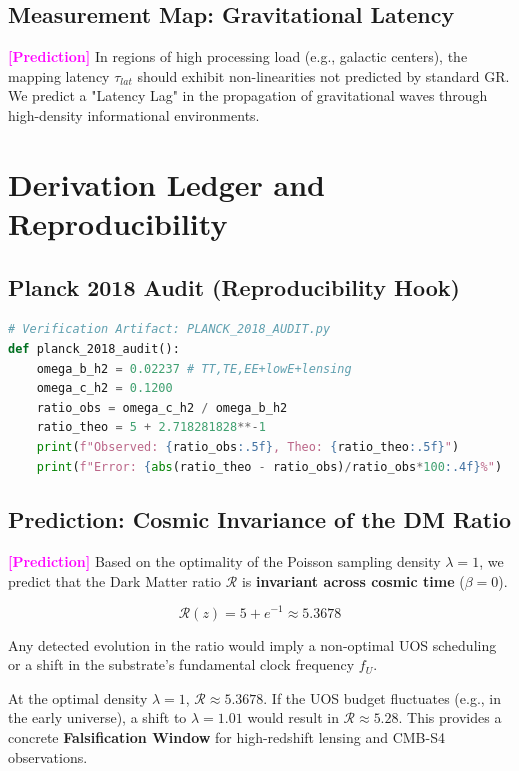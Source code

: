 \documentclass[11pt,titlepage]{article}
\newcommand{\tagpred}{\textcolor{magenta}{\textbf{[Prediction]}} }
\begin{document}
\subsection{Measurement Map: Gravitational Latency}
\tagpred In regions of high processing load (e.g., galactic centers), the mapping latency $\tau_{lat}$ should exhibit non-linearities not predicted by standard GR. We predict a "Latency Lag" in the propagation of gravitational waves through high-density informational environments.

\section{Derivation Ledger and Reproducibility}

\subsection{Planck 2018 Audit (Reproducibility Hook)}
\begin{lstlisting}[language=Python]
# Verification Artifact: PLANCK_2018_AUDIT.py
def planck_2018_audit():
    omega_b_h2 = 0.02237 # TT,TE,EE+lowE+lensing
    omega_c_h2 = 0.1200
    ratio_obs = omega_c_h2 / omega_b_h2
    ratio_theo = 5 + 2.718281828**-1
    print(f"Observed: {ratio_obs:.5f}, Theo: {ratio_theo:.5f}")
    print(f"Error: {abs(ratio_theo - ratio_obs)/ratio_obs*100:.4f}%")
\end{lstlisting}



\subsection{Prediction: Cosmic Invariance of the DM Ratio}
\tagpred Based on the optimality of the Poisson sampling density $\lambda=1$, we predict that the Dark Matter ratio $\mathcal{R}$ is \textbf{invariant across cosmic time} ($\beta = 0$). 

\begin{equation}
\mathcal{R}(z) = 5 + e^{-1} \approx 5.3678
\end{equation}

Any detected evolution in the ratio would imply a non-optimal UOS scheduling or a shift in the substrate's fundamental clock frequency $f_U$.

At the optimal density $\lambda=1$, $\mathcal{R} \approx 5.3678$. If the UOS budget fluctuates (e.g., in the early universe), a shift to $\lambda=1.01$ would result in $\mathcal{R} \approx 5.28$. This provides a concrete \textbf{Falsification Window} for high-redshift lensing and CMB-S4 observations.
\end{document}
